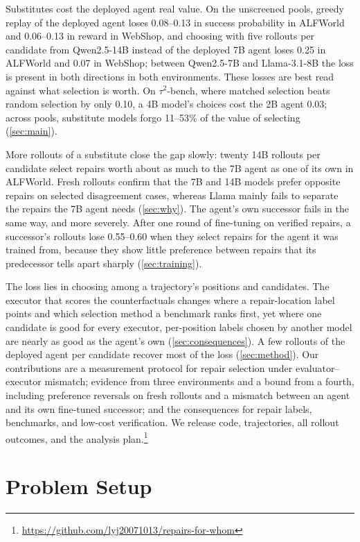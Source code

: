\documentclass{article}
\newcommand{\tautwo}{$\tau^2$-bench}
\theoremstyle{plain}
\theoremstyle{definition}
\theoremstyle{remark}
\begin{document}
Substitutes cost the deployed agent real value. On the unscreened pools, greedy replay of the deployed agent loses 0.08--0.13 in success probability in ALFWorld and 0.06--0.13 in reward in WebShop, and choosing with five rollouts per candidate from Qwen2.5-14B instead of the deployed 7B agent loses 0.25 in ALFWorld and 0.07 in WebShop; between Qwen2.5-7B and Llama-3.1-8B the loss is present in both directions in both environments. These losses are best read against what selection is worth. On \tautwo{}, where matched selection beats random selection by only 0.10, a 4B model's choices cost the 2B agent 0.03; across pools, substitute models forgo 11--53\% of the value of selecting (\cref{sec:main}).

More rollouts of a substitute close the gap slowly: twenty 14B rollouts per candidate select repairs worth about as much to the 7B agent as one of its own in ALFWorld. Fresh rollouts confirm that the 7B and 14B models prefer opposite repairs on selected disagreement cases, whereas Llama mainly fails to separate the repairs the 7B agent needs (\cref{sec:why}). The agent's own successor fails in the same way, and more severely. After one round of fine-tuning on verified repairs, a successor's rollouts lose 0.55--0.60 when they select repairs for the agent it was trained from, because they show little preference between repairs that its predecessor tells apart sharply (\cref{sec:training}).

The loss lies in choosing among a trajectory's positions and candidates. The executor that scores the counterfactuals changes where a repair-location label points and which selection method a benchmark ranks first, yet where one candidate is good for every executor, per-position labels chosen by another model are nearly as good as the agent's own (\cref{sec:consequences}). A few rollouts of the deployed agent per candidate recover most of the loss (\cref{sec:method}). Our contributions are a measurement protocol for repair selection under evaluator--executor mismatch; evidence from three environments and a bound from a fourth, including preference reversals on fresh rollouts and a mismatch between an agent and its own fine-tuned successor; and the consequences for repair labels, benchmarks, and low-cost verification. We release code, trajectories, all rollout outcomes, and the analysis plan.\footnote{\url{https://github.com/lyj20071013/repairs-for-whom}}

\section{Problem Setup}
\label{sec:problem}
\end{document}
